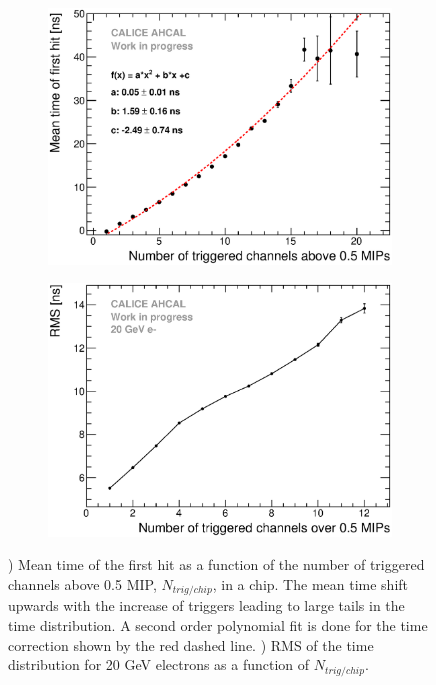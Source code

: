 \documentclass{JINST}
\begin{document}
\begin{figure}[htbp!]
  \begin{subfigure}[t]{0.49\textwidth}
    \centering
    \includegraphics[width=1\linewidth]{fig/NumberHits_Dependance_AllEnergies.eps}
    \caption{} \label{fig:nhits_profile}
  \end{subfigure}
  \hfill
  \begin{subfigure}[t]{0.49\textwidth}
    \centering
    \includegraphics[width=1\linewidth]{fig/ParametrisationPedestalShift_20GeV.eps}
    \caption{} \label{fig:nhits_RMS_profile}
  \end{subfigure}
  \caption{) Mean time of the first hit as a function of the number of triggered channels above 0.5 MIP, $N_{trig/chip}$, in a chip. The mean time shift upwards with the increase of triggers leading to large tails in the time distribution. A second order polynomial fit is done for the time correction shown by the red dashed line. ) RMS of the time distribution for 20 GeV electrons as a function of  $N_{trig/chip}$.}
\end{figure}
\end{document}
